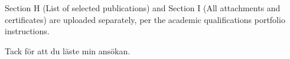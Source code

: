 


\maketitle

\tableofcontents

\vspace{1cm}
\noindent Section H (List of selected publications) and Section I (All attachments and certificates) are uploaded separately, per the academic qualifications portfolio instructions.



{
	\renewcommand\thesection{\roman{section}}
	\setlength\parindent{0pt}
	
}



{
	\setlength\parindent{0pt}
	
}











\vspace{2cm}

\vspace{0.5cm}
\noindent Tack f\"or att du l\"aste min ans\"okan.


